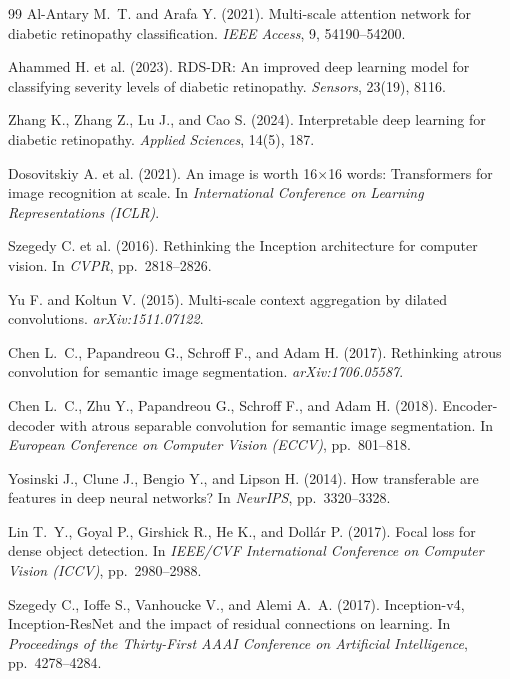 \documentclass[12pt,a4paper]{article}
\begin{document}
\begin{thebibliography}{99}
Al-Antary M.\ T. and Arafa Y. (2021).
Multi-scale attention network for diabetic retinopathy classification.
\emph{IEEE Access}, 9, 54190--54200.

Ahammed H. et al. (2023).
RDS-DR: An improved deep learning model for classifying severity levels of diabetic retinopathy.
\emph{Sensors}, 23(19), 8116.

Zhang K., Zhang Z., Lu J., and Cao S. (2024).
Interpretable deep learning for diabetic retinopathy.
\emph{Applied Sciences}, 14(5), 187.

Dosovitskiy A. et al. (2021).
An image is worth 16$\times$16 words: Transformers for image recognition at scale.
In \emph{International Conference on Learning Representations (ICLR)}.

Szegedy C. et al. (2016).
Rethinking the Inception architecture for computer vision.
In \emph{CVPR}, pp.\ 2818--2826.

Yu F. and Koltun V. (2015).
Multi-scale context aggregation by dilated convolutions.
\emph{arXiv:1511.07122}.

Chen L.\ C., Papandreou G., Schroff F., and Adam H. (2017).
Rethinking atrous convolution for semantic image segmentation.
\emph{arXiv:1706.05587}.

Chen L.\ C., Zhu Y., Papandreou G., Schroff F., and Adam H. (2018).
Encoder-decoder with atrous separable convolution for semantic image segmentation.
In \emph{European Conference on Computer Vision (ECCV)}, pp.\ 801--818.

Yosinski J., Clune J., Bengio Y., and Lipson H. (2014).
How transferable are features in deep neural networks?
In \emph{NeurIPS}, pp.\ 3320--3328.

Lin T.\ Y., Goyal P., Girshick R., He K., and Dollár P. (2017).
Focal loss for dense object detection.
In \emph{IEEE/CVF International Conference on Computer Vision (ICCV)}, pp.\ 2980--2988.

Szegedy C., Ioffe S., Vanhoucke V., and Alemi A.\ A. (2017).
Inception-v4, Inception-ResNet and the impact of residual connections on learning.
In \emph{Proceedings of the Thirty-First AAAI Conference on Artificial Intelligence},
pp.\ 4278--4284.


\end{thebibliography}
\end{document}
